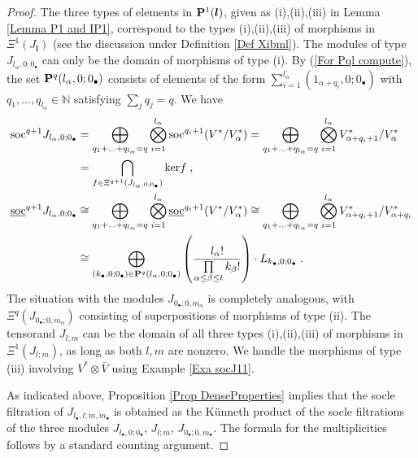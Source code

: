 \documentclass[12pt]{article}
\def\NN {{\mathbb N}}     %
\def\ul  {\underline}
\begin{document}
\begin{proof}
The three types of elements in ${\bf P}^{1}(\bm l)$, given as (i),(ii),(iii) in Lemma \ref{Lemma P1 and IP1}, correspond to the types (i),(ii),(iii) of morphisms in $\Xi^{1}(J_{\bm l})$ (see the discussion under Definition \ref{Def Xibml}). The modules of type $J_{l_\alpha,0;0_\bullet}$ can only be the domain of morphisms of type (i). By (\ref{For Pql compute}), the set ${\bf P}^{q}(l_\alpha,0;0_\bullet)$ consists of elements of the form $\sum\limits_{i=1}^{l_\alpha}(1_{\alpha+q_i},0;0_\bullet)$ with $q_1,...,q_{l_\alpha}\in\NN$ satisfying $\sum_j q_j=q$. We have
\begin{align*}
{\rm soc}^{q+1}J_{l_\alpha,0;0_\bullet} & = \bigoplus\limits_{q_1+...+q_{l_\alpha}=q}\bigotimes\limits_{i=1}^{l_\alpha} {\rm soc}^{q_i+1}(V^*/V^*_\alpha) = \bigoplus\limits_{q_1+...+q_{l_\alpha}=q}\bigotimes\limits_{i=1}^{l_\alpha} V^*_{\alpha+q_i+1}/V^*_\alpha \\ & = \bigcap\limits_{f\in\Xi^{q+1}(J_{l_\alpha,0;0_\bullet})} {\rm ker}f \;,\\
\ul{\rm soc}^{q+1}J_{l_\alpha,0;0_\bullet} & \cong \bigoplus\limits_{q_1+...+q_{l_\alpha}=q}\bigotimes\limits_{i=1}^{l_\alpha} \ul{\rm soc}^{q_i+1}(V^*/V^*_\alpha) \cong \bigoplus\limits_{q_1+...+q_{l_\alpha}=q}\bigotimes\limits_{i=1}^{l_\alpha} V^*_{\alpha+q_i+1}/V^*_{\alpha+q_i} \\ & \cong \bigoplus\limits_{(k_\bullet,0;0_\bullet)\in{\bf P}^q(l_\alpha,0;0_\bullet)} \left( \frac{l_\alpha!}{\prod\limits_{\alpha\leq \beta\leq t}k_\beta!} \right)  \cdot L_{k_\bullet,0;0_\bullet} \;.
\end{align*}
The situation with the modules $J_{0_\bullet;0,m_\alpha}$ is completely analogous, with $\Xi^q(J_{0_\bullet;0,m_\alpha})$ consisting of superpositions of morphisms of type (ii). The tensorand $J_{l;m}$ can be the domain of all three types (i),(ii),(iii) of morphisms in $\Xi^1(J_{l;m})$, as long as both $l,m$ are nonzero. We handle the morphisms of type (iii) involving $V^*\otimes \bar V$ using Example \ref{Exa socJ11}. 

As indicated above, Proposition \ref{Prop DenseProperties} implies that the socle filtration of $J_{l_\bullet,l;m,m_\bullet}$ is obtained as the K\"unneth product of the socle filtrations of the three modules $J_{l_\bullet,0;0_\bullet}$, $J_{l;m}$, $J_{0_\bullet;0,m_\bullet}$. The formula for the multiplicities follows by a standard counting argument.
\end{proof}
\end{document}
